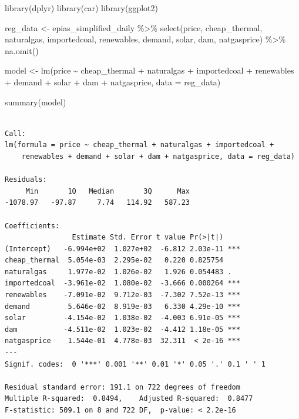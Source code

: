 \documentclass[
  11pt,
  a4paper,
]{article}
\newenvironment{Shaded}{\begin{snugshade}}{\end{snugshade}}
\newcommand{\AttributeTok}[1]{\textcolor[rgb]{0.40,0.45,0.13}{#1}}
\newcommand{\FunctionTok}[1]{\textcolor[rgb]{0.28,0.35,0.67}{#1}}
\newcommand{\NormalTok}[1]{\textcolor[rgb]{0.00,0.23,0.31}{#1}}
\newcommand{\OtherTok}[1]{\textcolor[rgb]{0.00,0.23,0.31}{#1}}
\newcommand{\SpecialCharTok}[1]{\textcolor[rgb]{0.37,0.37,0.37}{#1}}
\begin{document}
\begin{Shaded}
\begin{Highlighting}[]
\FunctionTok{library}\NormalTok{(dplyr)}
\FunctionTok{library}\NormalTok{(car)}
\FunctionTok{library}\NormalTok{(ggplot2)}

\NormalTok{reg\_data }\OtherTok{\textless{}{-}}\NormalTok{ epias\_simplified\_daily }\SpecialCharTok{\%\textgreater{}\%}
  \FunctionTok{select}\NormalTok{(price, cheap\_thermal, naturalgas, importedcoal, renewables, demand, solar, dam, natgasprice) }\SpecialCharTok{\%\textgreater{}\%}
  \FunctionTok{na.omit}\NormalTok{()}


\NormalTok{model }\OtherTok{\textless{}{-}} \FunctionTok{lm}\NormalTok{(price }\SpecialCharTok{\textasciitilde{}}\NormalTok{ cheap\_thermal }\SpecialCharTok{+}\NormalTok{ naturalgas }\SpecialCharTok{+}\NormalTok{ importedcoal }\SpecialCharTok{+}\NormalTok{ renewables }\SpecialCharTok{+}\NormalTok{ demand }\SpecialCharTok{+}\NormalTok{ solar }\SpecialCharTok{+}\NormalTok{ dam }\SpecialCharTok{+}\NormalTok{ natgasprice, }\AttributeTok{data =}\NormalTok{ reg\_data)}

\FunctionTok{summary}\NormalTok{(model)}
\end{Highlighting}
\end{Shaded}

\begin{verbatim}

Call:
lm(formula = price ~ cheap_thermal + naturalgas + importedcoal + 
    renewables + demand + solar + dam + natgasprice, data = reg_data)

Residuals:
     Min       1Q   Median       3Q      Max 
-1078.97   -97.87     7.74   114.92   587.23 

Coefficients:
                Estimate Std. Error t value Pr(>|t|)    
(Intercept)   -6.994e+02  1.027e+02  -6.812 2.03e-11 ***
cheap_thermal  5.054e-03  2.295e-02   0.220 0.825754    
naturalgas     1.977e-02  1.026e-02   1.926 0.054483 .  
importedcoal  -3.961e-02  1.080e-02  -3.666 0.000264 ***
renewables    -7.091e-02  9.712e-03  -7.302 7.52e-13 ***
demand         5.646e-02  8.919e-03   6.330 4.29e-10 ***
solar         -4.154e-02  1.038e-02  -4.003 6.91e-05 ***
dam           -4.511e-02  1.023e-02  -4.412 1.18e-05 ***
natgasprice    1.544e-01  4.778e-03  32.311  < 2e-16 ***
---
Signif. codes:  0 '***' 0.001 '**' 0.01 '*' 0.05 '.' 0.1 ' ' 1

Residual standard error: 191.1 on 722 degrees of freedom
Multiple R-squared:  0.8494,    Adjusted R-squared:  0.8477 
F-statistic: 509.1 on 8 and 722 DF,  p-value: < 2.2e-16
\end{verbatim}
\end{document}
